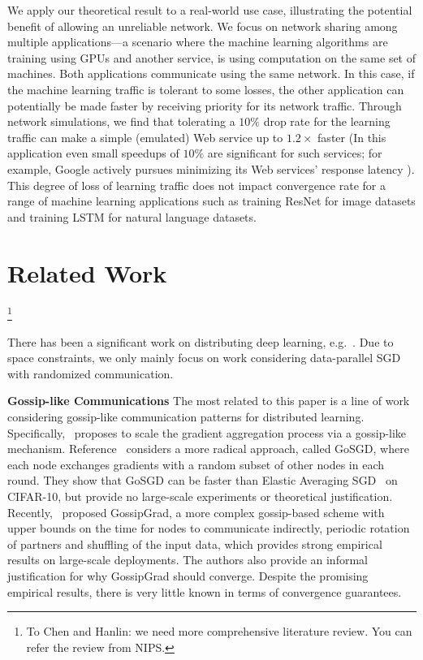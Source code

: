 \documentclass{article}
\renewcommand{\paragraph}[1]{\noindent\textbf{#1}}
\def\rc{\color{red}}
\newcounter{thm_counter}
\begin{document}
We apply our theoretical result to a real-world use case,
illustrating the potential benefit of allowing an unreliable network. We focus on network sharing among multiple applications---a scenario where the machine learning algorithms are training using 
GPUs and another service, is using computation on the same set of machines. Both applications communicate using the same network. In this case, if the machine learning traffic is tolerant to some losses, the other application can potentially be made faster by receiving priority for its network traffic. Through network simulations, we find that tolerating a $10\%$ drop rate for the learning traffic can make a simple (emulated) Web service up to $1.2\times$ faster
(In this application even small speedups of $10\%$ are significant for such services; for example, Google actively pursues minimizing its Web services' response latency ). This degree of loss of learning traffic does not impact convergence rate for a range of machine learning applications such as training ResNet for image datasets and training LSTM for natural language datasets.

\section{Related Work}

\footnote{\rc To Chen and Hanlin: we need more comprehensive literature review. You can refer the review from NIPS.}

There has been a significant work on distributing deep learning, e.g.~\cite{seide2016cntk,abadi2016tensorflow,goyal2017accurate}. Due to space constraints, we only mainly focus on work considering data-parallel SGD with randomized communication. 

\paragraph{Gossip-like Communications} The most related to this
paper is a line of work considering gossip-like communication
patterns for distributed learning. 
Specifically,~\cite{jin2016scale} proposes to scale the gradient aggregation process via a gossip-like mechanism. Reference~\cite{blot2016gossip} considers a more radical approach, called GoSGD, where each node exchanges gradients with a random subset of other nodes in each round. They show that GoSGD can be faster than Elastic Averaging SGD~\cite{zhang2015deep} on CIFAR-10, but provide no large-scale experiments or theoretical justification. 
Recently,~\cite{daily2018gossipgrad} proposed GossipGrad, a more complex gossip-based scheme with upper bounds on the time for nodes to communicate indirectly, periodic rotation of partners and shuffling of the input data, which provides strong empirical results on large-scale deployments. 
The authors also provide an informal justification for why GossipGrad should converge. Despite the promising empirical results, there is very little known in terms of convergence guarantees. 
\end{document}
